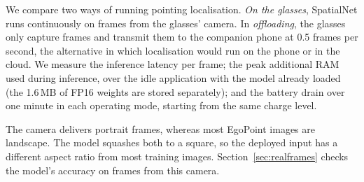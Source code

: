 We compare two ways of running pointing localisation. \emph{On the glasses}, SpatialNet runs continuously on frames from the glasses' camera. In \emph{offloading}, the glasses only capture frames and transmit them to the companion phone at 0.5 frames per second, the alternative in which localisation would run on the phone or in the cloud. We measure the inference latency per frame; the peak additional RAM used during inference, over the idle application with the model already loaded (the 1.6\,MB of FP16 weights are stored separately); and the battery drain over one minute in each operating mode, starting from the same charge level.

The camera delivers portrait frames, whereas most EgoPoint images are landscape. The model squashes both to a square, so the deployed input has a different aspect ratio from most training images. Section~\ref{sec:realframes} checks the model's accuracy on frames from this camera.
